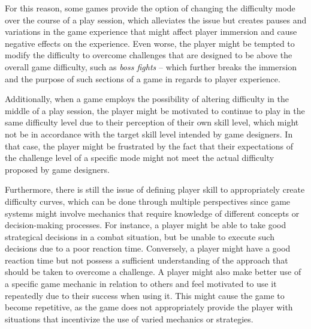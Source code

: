 For this reason, some games provide the option of changing the difficulty mode over the course of a play session, which alleviates the issue but creates pauses and variations in the game experience that might affect player immersion and cause negative effects on the experience. Even worse, the player might be tempted to modify the difficulty to overcome challenges that are designed to be above the overall game difficulty, such as \emph{boss fights} -- which further breaks the immersion and the purpose of such sections of a game in regards to player experience.

Additionally, when a game employs the possibility of altering difficulty in the middle of a play session, the player might be motivated to continue to play in the same difficulty level due to their perception of their own skill level, which might not be in accordance with the target skill level intended by game designers. In that case, the player might be frustrated by the fact that their expectations of the challenge level of a specific mode might not meet the actual difficulty proposed by game designers.

Furthermore, there is still the issue of defining player skill to appropriately create difficulty curves, which can be done through multiple perspectives since game systems might involve mechanics that require knowledge of different concepts or decision-making processes. For instance, a player might be able to take good strategical decisions in a combat situation, but be unable to execute such decisions due to a poor reaction time. Conversely, a player might have a good reaction time but not possess a sufficient understanding of the approach that should be taken to overcome a challenge. A player might also make better use of a specific game mechanic in relation to others and feel motivated to use it repeatedly due to their success when using it. This might cause the game to become repetitive, as the game does not appropriately provide the player with situations that incentivize the use of varied mechanics or strategies.


